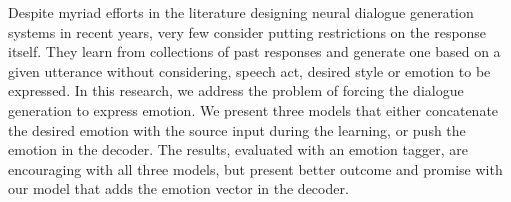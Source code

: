 Despite myriad efforts in the literature designing neural dialogue generation systems in recent years, very few consider putting restrictions on the response itself. They learn from collections of past responses and generate one based on a given utterance without considering, speech act, desired style or emotion to be expressed. In this research, we address the problem of forcing the dialogue generation to express emotion. We present three models that either concatenate the desired emotion with the source input during the learning, or push the emotion in the decoder. The results, evaluated with an emotion tagger, are encouraging with all three models, but present better outcome and promise with our model that adds the emotion vector in the decoder.
